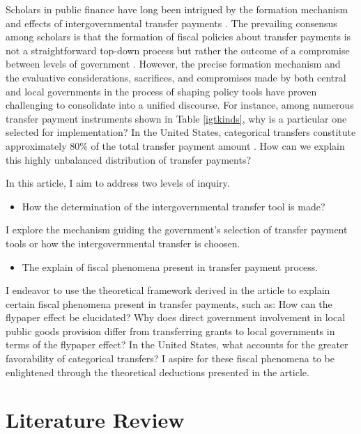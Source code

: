 \documentclass[man]{apa7}
\begin{document}
Scholars in public finance have long been intrigued by the formation mechanism and effects of intergovernmental transfer payments \parencite{1988Exploring,1967American, 2010Centralization}. The prevailing consensus among scholars is that the formation of fiscal policies about transfer payments is not a straightforward top-down process but rather the outcome of a compromise between levels of government \parencite{chubb1985political, 1976A, dixit1995redistributive}. However, the precise formation mechanism and the evaluative considerations, sacrifices, and compromises made by both central and local governments in the process of shaping policy tools have proven challenging to consolidate into a unified discourse. For instance, among numerous transfer payment instruments shown in Table \ref{igtkinds}, why is a particular one selected for implementation? In the United States, categorical transfers constitute approximately 80\% of the total transfer payment amount \parencite{dilger2015federal}. How can we explain this highly unbalanced distribution of transfer payments?

In this article, I aim to address two levels of inquiry.
\begin{itemize}
  \item How the determination of the intergovernmental transfer tool is made?
\end{itemize}

I explore the mechanism guiding the government's selection of transfer payment tools or how the intergovernmental transfer is choosen.

\begin{itemize}
  \item The explain of fiscal phenomena present in transfer payment process.
\end{itemize}

I endeavor to use the theoretical framework derived in the article to explain certain fiscal phenomena present in transfer payments, such as: How can the flypaper effect be elucidated? Why does direct government involvement in local public goods provision differ from transferring grants to local governments in terms of the flypaper effect? In the United States, what accounts for the greater favorability of categorical transfers? I aspire for these fiscal phenomena to be enlightened through the theoretical deductions presented in the article.

\section{Literature Review}
\end{document}
